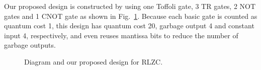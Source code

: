 \documentclass[%
reprint,
 amsmath,amssymb,
 aps,
]{revtex4-1}
\begin{document}
\par Our proposed design is constructed by using one Toffoli gate, 3 TR gates, 2 NOT gates and 1 CNOT gate as shown in Fig.~\ref{fig:proposed_RLZC}. Because each basic gate is counted as quantum cost 1, this design has quantum cost 20, garbage output 4 and constant input 4, respectively, and even reuses mantissa bits to reduce the number of garbage outputs. 



\begin{figure}%

\parbox{2in}{
}%
\hspace{2em}
\begin{minipage}{1.2in}%

\end{minipage}%
\caption{Diagram and our proposed design for RLZC.}%
\label{fig:proposed_RLZC}%
\end{figure}
\end{document}
